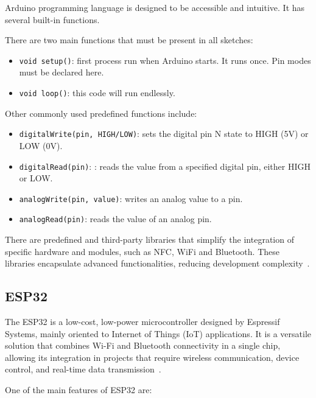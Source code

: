 Arduino programming language is designed to be accessible and intuitive. It has several built-in functions.

There are two main functions that must be present in all sketches:

\begin{itemize}
	\item \texttt{void setup()}: first process run when Arduino starts. It runs once. Pin modes must be declared here.
	\item \texttt{void loop()}: this code will run endlessly.
\end{itemize}

Other commonly used predefined functions include:

\begin{itemize}
	\item \texttt{digitalWrite(pin, HIGH/LOW)}: sets the digital pin N state to HIGH (5V) or LOW (0V).
	\item \texttt{digitalRead(pin)}: : reads the value from a specified digital pin, either HIGH or
	LOW.
	\item \texttt{analogWrite(pin, value)}: writes an analog value to a pin.
	\item \texttt{analogRead(pin)}: reads the value of an analog pin.
\end{itemize}

There are predefined and third-party libraries that simplify the integration of specific
hardware and modules, such as NFC, WiFi and Bluetooth. These libraries
encapsulate advanced functionalities, reducing development complexity~\cite{Ref10}.

\subsection{ESP32}
\label{subsec:esp32}


The ESP32 is a low-cost, low-power microcontroller designed by Espressif Systems, mainly oriented to Internet of Things (IoT) applications. It is a versatile solution that combines Wi-Fi and Bluetooth connectivity in a single chip, allowing its integration in projects that require wireless communication, device control, and real-time data transmission~\cite{Ref11}.

One of the main features of ESP32 are:

